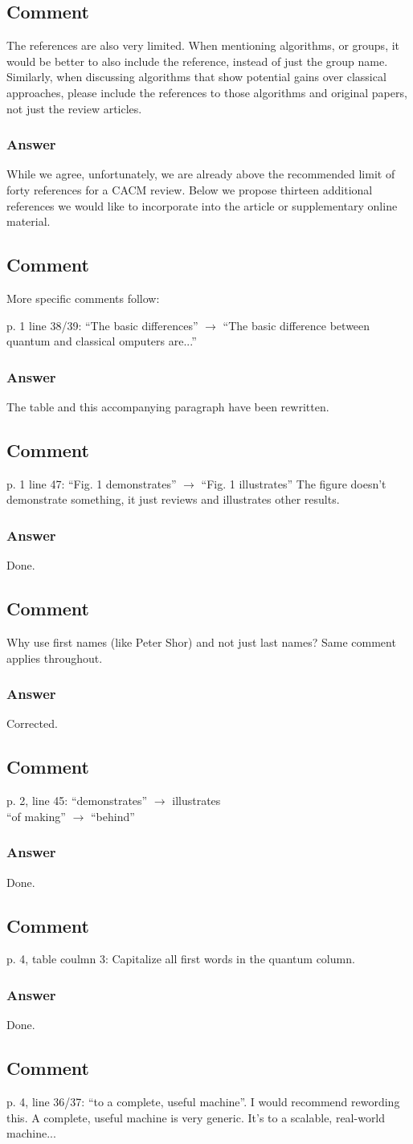 \documentclass{article}
\newcommand{\comment}{\subsection{Comment}\em}
\newcommand{\answer}{\rm \subsubsection*{Answer}}
\begin{document}
\comment

The references are also very limited.  When mentioning algorithms, or
groups, it would be better to also include the reference, instead of
just the group name.  Similarly, when discussing algorithms that show
potential gains over classical approaches, please include the
references to those algorithms and original papers, not just the
review articles.

\answer

While we agree, unfortunately, we are already above the recommended
limit of forty references for a CACM review.  Below we propose
thirteen additional references we would like to incorporate into the
article or supplementary online material.

\comment

More specific comments follow:

p. 1 line 38/39: ``The basic differences'' $\rightarrow$ ``The basic difference between quantum and classical omputers are...''

\answer

The table and this accompanying paragraph have been rewritten.

\comment

p. 1 line 47: ``Fig. 1 demonstrates'' $\rightarrow$ ``Fig. 1 illustrates''  The figure doesn't demonstrate something, it just reviews and illustrates other results.

\answer

Done.

\comment

Why use first names (like Peter Shor) and not just last names?  Same comment applies throughout.

\answer

Corrected.

\comment

p. 2, line 45: ``demonstrates'' $\rightarrow$ illustrates\\
``of making'' $\rightarrow$ ``behind''

\answer

Done.

\comment

p. 4, table coulmn 3: Capitalize all first words in the quantum column.

\answer

Done.

\comment

p. 4, line 36/37: ``to a complete, useful machine''.  I would recommend rewording this.  A complete, useful machine is very generic.  It's to a scalable, real-world machine...
\end{document}

